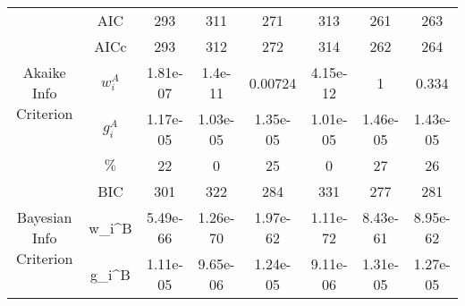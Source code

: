 \begin{tabular}{|cc|c|c|c|c|c|c|}
\cline{1-8}
\hline \multirow{5}{*}{Akaike Info Criterion} & AIC &                                      293 &                                      311 &                                      271 &                                      313 &                                      261 &                                      263 \\
          & AICc &                                      293 &                                      312 &                                      272 &                                      314 &                                      262 &                                      264 \\
          & $w_i^A$ &                                 1.81e-07 &                                  1.4e-11 &                                  0.00724 &                                 4.15e-12 &                                        1 &                                    0.334 \\
          & $g_i^A$ &                                 1.17e-05 &                                 1.03e-05 &                                 1.35e-05 &                                 1.01e-05 &                                 1.46e-05 &                                 1.43e-05 \\
          & $\%$ &                                       22 &                                        0 &                                       25 &                                        0 &                                       27 &                                       26 \\
\cline{1-8}
\hline \multirow{4}{*}{Bayesian Info Criterion} & BIC &                                      301 &                                      322 &                                      284 &                                      331 &                                      277 &                                      281 \\
          & w_i^B &                                 5.49e-66 &                                 1.26e-70 &                                 1.97e-62 &                                 1.11e-72 &                                 8.43e-61 &                                 8.95e-62 \\
          & g_i^B &                                 1.11e-05 &                                 9.65e-06 &                                 1.24e-05 &                                 9.11e-06 &                                 1.31e-05 &                                 1.27e-05 \\

\end{tabular}
